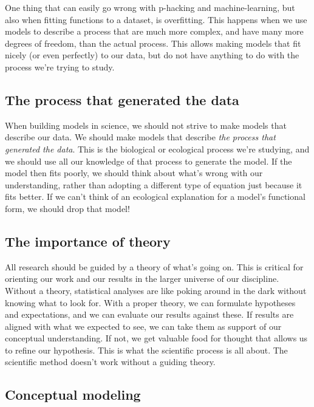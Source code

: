 \documentclass[
]{book}
\begin{document}
One thing that can easily go wrong with p-hacking and machine-learning, but also when fitting functions to a dataset, is overfitting. This happens when we use models to describe a process that are much more complex, and have many more degrees of freedom, than the actual process. This allows making models that fit nicely (or even perfectly) to our data, but do not have anything to do with the process we're trying to study.

\hypertarget{the-process-that-generated-the-data}{%
\subsection{The process that generated the data}\label{the-process-that-generated-the-data}}

When building models in science, we should not strive to make models that describe our data. We should make models that describe \emph{the process that generated the data}. This is the biological or ecological process we're studying, and we should use all our knowledge of that process to generate the model. If the model then fits poorly, we should think about what's wrong with our understanding, rather than adopting a different type of equation just because it fits better. If we can't think of an ecological explanation for a model's functional form, we should drop that model!

\hypertarget{the-importance-of-theory}{%
\subsection{The importance of theory}\label{the-importance-of-theory}}

All research should be guided by a theory of what's going on. This is critical for orienting our work and our results in the larger universe of our discipline. Without a theory, statistical analyses are like poking around in the dark without knowing what to look for. With a proper theory, we can formulate hypotheses and expectations, and we can evaluate our results against these. If results are aligned with what we expected to see, we can take them as support of our conceptual understanding. If not, we get valuable food for thought that allows us to refine our hypothesis. This is what the scientific process is all about. The scientific method doesn't work without a guiding theory.

\hypertarget{conceptual-modeling}{%
\subsection{Conceptual modeling}\label{conceptual-modeling}}
\end{document}
